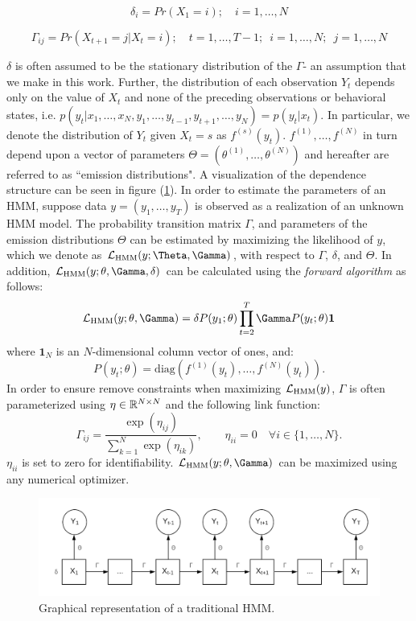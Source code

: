 $$\delta_i = Pr(X_1 = i); \quad i = 1,\ldots,N$$

$$\Gamma_{ij} = Pr(X_{t+1} = j | X_t = i); \quad t = 1, \ldots, T-1; \enspace i = 1,\ldots,N; \enspace j=1,\ldots,N $$

$\delta$ is often assumed to be the stationary distribution of the $\Gamma$- an assumption that we make in this work. Further, the distribution of each observation $Y_t$ depends only on the value of $X_t$ and none of the preceding observations or behavioral states, i.e. $p(y_t|x_1,\ldots, x_N, y_1,\ldots,y_{t-1},y_{t+1},\ldots,y_N) = p(y_t|x_t)$. In particular, we denote the distribution of $Y_t$ given $X_t = s$ as $f^{(s)}(y_t)$. $f^{(1)},\ldots,f^{(N)}$ in turn depend upon a vector of parameters $\Theta = (\theta^{(1)},\ldots,\theta^{(N)})$ and hereafter are referred to as ``emission distributions". A visualization of the dependence structure can be seen in figure (\ref{fig:HMM}).
In order to estimate the parameters of an HMM, suppose data $y = (y_1,\ldots,y_T)$ is observed as a realization of an unknown HMM model. The probability transition matrix $\Gamma$, and parameters of the emission distributions $\Theta$ can be estimated by maximizing the likelihood of $y$, which we denote as $\calL_{\text{HMM}}(y;\Theta,\Gamma)$, with respect to $\Gamma$, $\delta$, and $\Theta$. In addition, $\calL_{\text{HMM}}(y;\theta,\Gamma,\delta)$ can be calculated using the \textit{forward algorithm} \cite{Zucchini:2016} as follows:
%
$$\calL_{\text{HMM}}(y;\theta,\Gamma) = \delta P(y_1;\theta) \prod_{t=2}^T \Gamma P(y_t;\theta) \mathbf{1}$$
%
where $\mathbf{1}_N$ is an $N$-dimensional column vector of ones, and:
%
$$P(y_t;\theta) = \text{diag}(f^{(1)}(y_t),\ldots , f^{(N)}(y_t)).$$
%
In order to ensure remove constraints when maximizing $\mathcal{L}_{\text{HMM}}(y)$, $\Gamma$ is often parameterized using $\eta \in \mathbb{R}^{N \times N}$ and the following link function:
%
$$\Gamma_{ij} = \frac{\exp(\eta_{ij})}{\sum_{k=1}^N \exp(\eta_{ik})}, \qquad \eta_{ii} = 0 \quad \forall i \in \{1, \ldots, N\}.$$
%
$\eta_{ii}$ is set to zero for identifiability. $\calL_{\text{HMM}}(y;\theta,\Gamma)$ can be maximized using any numerical optimizer.

\begin{figure}[h!]
	\centering
	\includegraphics[width=5in]{../Plots/HMM.png}
	\caption{Graphical representation of a traditional HMM.}
	\label{fig:HMM}
\end{figure}


